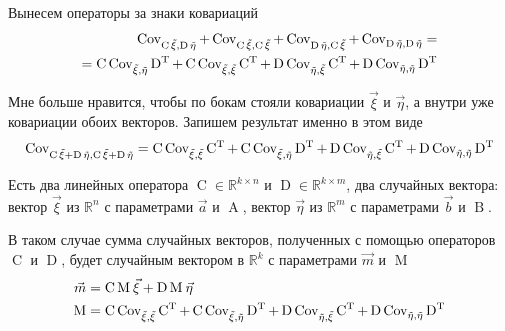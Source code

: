 Вынесем операторы за знаки ковариаций
\begin{align*}
\operatorname{Cov^{}_{\operatorname{C} \vec{\xi}, \operatorname{D} \vec{\eta}}}
  + \operatorname{Cov^{}_{\operatorname{C} \vec{\xi}, \operatorname{C} \vec{\xi}}}
  + \operatorname{Cov^{}_{\operatorname{D} \vec{\eta}, \operatorname{C} \vec{\xi}}}
  + \operatorname{Cov^{}_{\operatorname{D} \vec{\eta}, \operatorname{D} \vec{\eta}}} = \\
= \operatorname{C} \operatorname{Cov^{}_{\vec{\xi}, \vec{\eta}}} \operatorname{D^T}
  + \operatorname{C} \operatorname{Cov^{}_{\vec{\xi}, \vec{\xi}}} \operatorname{C^T}
  + \operatorname{D} \operatorname{Cov^{}_{\vec{\eta}, \vec{\xi}}} \operatorname{C^T}
  + \operatorname{D} \operatorname{Cov^{}_{\vec{\eta}, \vec{\eta}}} \operatorname{D^T}
\end{align*}

Мне больше нравится, чтобы по бокам стояли ковариации $\vec{\xi}$ и
$\vec{\eta}$, а внутри уже ковариации обоих векторов. Запишем результат именно в
этом виде
\begin{align*}
\operatorname{Cov^{}_{\operatorname{C} \vec{\xi} + \operatorname{D} \vec{\eta}, \operatorname{C} \vec{\xi} + \operatorname{D} \vec{\eta}}}
  = \operatorname{C} \operatorname{Cov^{}_{\vec{\xi}, \vec{\xi}}} \operatorname{C^T}
      + \operatorname{C} \operatorname{Cov^{}_{\vec{\xi}, \vec{\eta}}} \operatorname{D^T}
      + \operatorname{D} \operatorname{Cov^{}_{\vec{\eta}, \vec{\xi}}} \operatorname{C^T}
      + \operatorname{D} \operatorname{Cov^{}_{\vec{\eta}, \vec{\eta}}} \operatorname{D^T}
\end{align*}

\begin{affirmation}\label{affirmation:randomVector:linearTransformations}
  Есть два линейных оператора $\operatorname{C} \in \mathbb{R}^{k \times n}$
  и $\operatorname{D} \in \mathbb{R}^{k \times m}$, два случайных вектора:
  вектор $\vec{\xi}$ из $\mathbb{R}^n$ с параметрами $\vec{a}$ и
  $\operatorname{A}$, вектор $\vec{\eta}$ из $\mathbb{R}^m$ с параметрами
  $\vec{b}$ и $\operatorname{B}$.

  В таком случае сумма случайных векторов, полученных с помощью операторов
  $\operatorname{C}$ и $\operatorname{D}$, будет случайным вектором
  в $\mathbb{R}^k$ с параметрами $\vec{m}$ и $\operatorname{M}$
  \begin{align*}
      \vec{m} &= \operatorname{C} \operatorname{M}_{} \vec{\xi}
      + \operatorname{D} \operatorname{M}_{} \vec{\eta} \\
      \operatorname{M} &= \operatorname{C} \operatorname{Cov^{}_{\vec{\xi}, \vec{\xi}}} \operatorname{C^T}
      + \operatorname{C} \operatorname{Cov^{}_{\vec{\xi}, \vec{\eta}}} \operatorname{D^T}
      + \operatorname{D} \operatorname{Cov^{}_{\vec{\eta}, \vec{\xi}}} \operatorname{C^T}
      + \operatorname{D} \operatorname{Cov^{}_{\vec{\eta}, \vec{\eta}}} \operatorname{D^T}
  \end{align*}
\end{affirmation}

